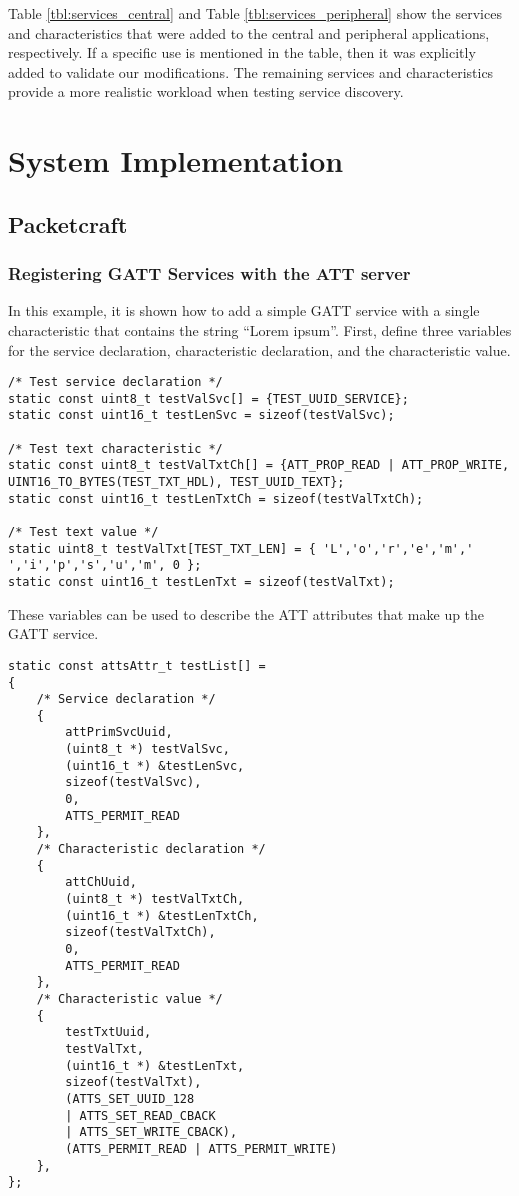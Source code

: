 Table \ref{tbl:services_central} and Table \ref{tbl:services_peripheral} show the services and characteristics that were added to the central and peripheral applications, respectively. If a specific use is mentioned in the table, then it was explicitly added to validate our modifications. The remaining services and characteristics provide a more realistic workload when testing service discovery.

\section{System Implementation}
\subsection{Packetcraft}
\subsubsection{Registering GATT Services with the ATT server}
In this example, it is shown how to add a simple GATT service with a single characteristic that contains the string ``Lorem ipsum''. First, define three variables for the service declaration, characteristic declaration, and the characteristic value.
\begin{lstlisting}
/* Test service declaration */
static const uint8_t testValSvc[] = {TEST_UUID_SERVICE};
static const uint16_t testLenSvc = sizeof(testValSvc);

/* Test text characteristic */
static const uint8_t testValTxtCh[] = {ATT_PROP_READ | ATT_PROP_WRITE, UINT16_TO_BYTES(TEST_TXT_HDL), TEST_UUID_TEXT};
static const uint16_t testLenTxtCh = sizeof(testValTxtCh);

/* Test text value */
static uint8_t testValTxt[TEST_TXT_LEN] = { 'L','o','r','e','m',' ','i','p','s','u','m', 0 };
static const uint16_t testLenTxt = sizeof(testValTxt);
\end{lstlisting} 
These variables can be used to describe the ATT attributes that make up the GATT service.
\begin{lstlisting}
static const attsAttr_t testList[] =
{
    /* Service declaration */
    {
        attPrimSvcUuid,
        (uint8_t *) testValSvc,
        (uint16_t *) &testLenSvc,
        sizeof(testValSvc),
        0,
        ATTS_PERMIT_READ
    },
    /* Characteristic declaration */
    {
        attChUuid,
        (uint8_t *) testValTxtCh,
        (uint16_t *) &testLenTxtCh,
        sizeof(testValTxtCh),
        0,
        ATTS_PERMIT_READ
    },
    /* Characteristic value */
    {
        testTxtUuid,
        testValTxt,
        (uint16_t *) &testLenTxt,
        sizeof(testValTxt),
        (ATTS_SET_UUID_128 
        | ATTS_SET_READ_CBACK 
        | ATTS_SET_WRITE_CBACK),
        (ATTS_PERMIT_READ | ATTS_PERMIT_WRITE)
    },
};
\end{lstlisting} 
